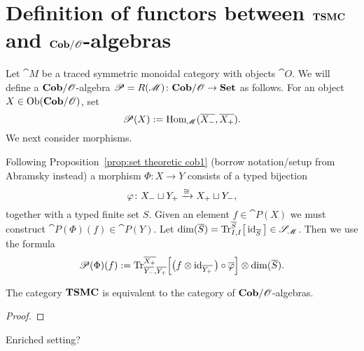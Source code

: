 \section{Definition of functors between $\mathbf{TSMC}$ and $\mathbf{Cob}/\mathscr{O}$-algebras}

Let $\cat{M}$ be a traced symmetric monoidal category with objects $\cat{O}$. We will define a $\mathbf{Cob}/\mathscr{O}$-algebra $\mathscr{P}=R(\mathscr{M})\colon\mathbf{Cob}/\mathscr{O}\to\mathbf{Set}$ as follows. For an object $X\in\operatorname{Ob}(\mathbf{Cob}/\mathscr{O})$, set 
$$\mathscr{P}(X):=\operatorname{Hom}_{\mathscr{M}}(\overline{{X_-}},\overline{{X_+}}).$$
We next consider morphisms.

Following Proposition~\ref{prop:set theoretic cob1} (borrow notation/setup from Abramsky instead) a morphism $\Phi\colon X\longrightarrow Y$ consists of a typed bijection 
$$\varphi\colon{X_-}\sqcup {Y_+}\xrightarrow{\cong}{X_+}\sqcup {Y_-},$$ 
together with a typed finite set $S$. Given an element $f\in\cat{P}(X)$ we must construct $\cat{P}(\Phi)(f)\in\cat{P}(Y)$. Let $\dim(\overline{S})=\textnormal{Tr}^{\overline{S}}_{I,I}\big[\operatorname{id}_{\overline{S}}\big]\in\mathscr{S}_{\mathscr{M}}$. Then we use the formula
$$\mathscr{P}(\Phi)(f):=
\textnormal{Tr}^{\overline{X_+}}_{\overline{Y_-},\overline{Y_+}}\Big[\big(f\otimes\operatorname{id}_{\overline{Y_+}}\big)\circ\overline{\varphi}\Big]
\otimes\dim(\overline{S}).	
$$

\begin{theorem}
 The category $\mathbf{TSMC}$ is equivalent to the category of $\mathbf{Cob}/\mathscr{O}$-algebras.
\end{theorem}
\begin{proof}
 
\end{proof}
\begin{corollary}
 Enriched setting?
\end{corollary}


